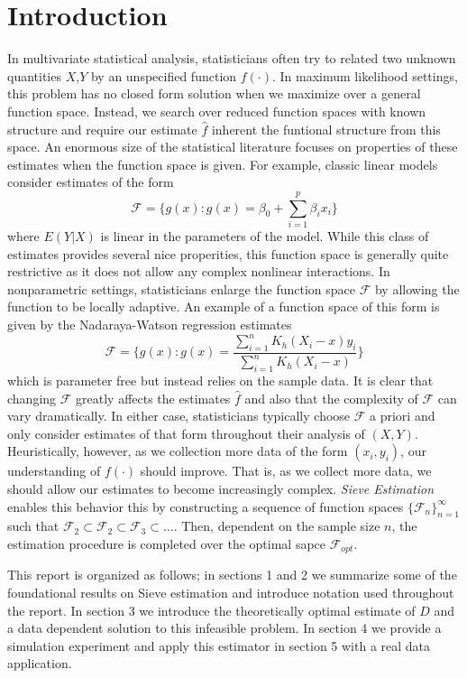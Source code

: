 \documentclass[12pt]{article}  %
\begin{document}
\section{Introduction}
In multivariate statistical analysis, statisticians often try to related two unknown quantities $X$,$Y$ by an unspecified function $f(\cdot)$. In maximum likelihood settings, this problem has no closed form solution when we maximize over a general function space. Instead, we search over reduced function spaces with known structure and require our estimate $\hat{f}$ inherent the funtional structure from this space. An enormous size of the statistical literature focuses on properties of these estimates when the function space is given. For example, classic linear models consider estimates of the form $$\mathcal{F} = \Big\{g(x): g(x) = \beta_0 + \sum_{i=1}^{p}\beta_ix_i\Big\}$$ where $E(Y|X)$ is linear in the parameters of the model. While this class of estimates provides several nice properities, this function space is generally quite restrictive as it does not allow any complex nonlinear interactions. In nonparametric settings, statisticians enlarge the function space $\mathcal{F}$ by allowing the function to be locally adaptive. An example of a function space of this form is given by the Nadaraya-Watson regression estimates $$\mathcal{F} = \Big\{g(x): g(x) = \frac{\sum_{i=1}^n K_h(X_i - x)y_i}{\sum_{i=1}^n K_h(X_i - x)}\Big\}$$
which is parameter free but instead relies on the sample data. It is clear that changing $\mathcal{F}$ greatly affects the estimates $\hat{f}$ and also that the complexity of $\mathcal{F}$ can vary dramatically. In either case, statisticians typically choose $\mathcal{F}$ a priori and only consider estimates of that form throughout their analysis of $(X,Y)$. Heuristically, however, as we collection more data of the form $(x_i, y_i)$, our understanding of $f(\cdot)$ should improve. That is, as we collect more data, we should allow our estimates to become increasingly complex. \textit{Sieve Estimation} enables this behavior this by constructing a sequence of function spaces $\{\mathcal{F}_n\}_{n=1}^{\infty}$ such that $\mathcal{F}_2\subset\mathcal{F}_2\subset\mathcal{F}_3\subset\ldots$. Then, dependent on the sample size $n$, the estimation procedure is completed over the optimal sapce $\mathcal{F}_{opt}$. 

This report is organized as follows; in sections 1 and 2 we summarize some of the foundational results on Sieve estimation and introduce notation used throughout the report. In section 3 we introduce the theoretically optimal estimate of $D$ and a data dependent solution to this infeasible problem. In section 4 we provide a simulation experiment and apply this estimator in section 5 with a real data application. 
\end{document}
